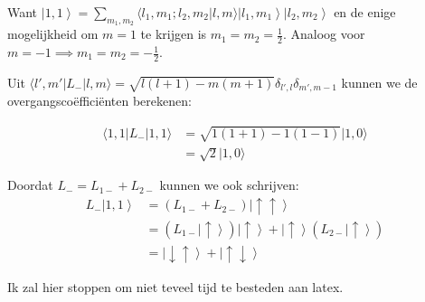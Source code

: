 Want \(\left| 1, 1 \right\rangle = \sum_{m_1, m_2} \langle l_1, m_1; l_2, m_2 | l, m \rangle \left| l_1, m_1 \right\rangle \left| l_2, m_2 \right\rangle\) en de enige mogelijkheid om \(m=1\) te krijgen is \(m_1 = m_2 = \frac{1}{2}\).
Analoog voor \(m=-1 \implies m_1 = m_2 = -\frac{1}{2}\).


Uit \(\langle l',m' | L_{-} | l, m \rangle = \sqrt{l(l+1) - m(m+1)} \delta_{l',l} \delta_{m',m-1}\) kunnen we de overgangscoëfficiënten berekenen:


\begin{align*}
    \langle 1, 1 | L_{-} | 1,1 \rangle &= \sqrt{1(1+1)-1(1-1)}|1,0\rangle \\
    &=  \sqrt{2} |1,0\rangle
\end{align*}

Doordat \(L_{-} = L_{1-} + L_{2-}\) kunnen we ook schrijven:
\begin{align*}
    L_{-} \left| 1,1 \right\rangle &= (L_{1-} + L_{2-}) \left| \uparrow \uparrow \right\rangle \\
    &= (L_{1-} \left| \uparrow \right\rangle)\left| \uparrow \right\rangle + \left|\uparrow \right\rangle (L_{2-} \left| \uparrow \right\rangle) \\
    &= \left| \downarrow\uparrow \right\rangle +  \left|\uparrow \downarrow \right\rangle
\end{align*}

Ik zal hier stoppen om niet teveel tijd te besteden aan latex.
